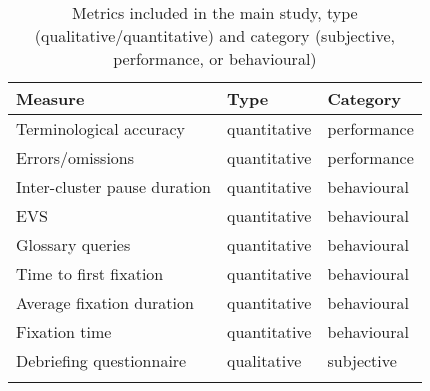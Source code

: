 \begin{table}
 \begin{tabular}{lll}
 \lsptoprule
 {Measure} & {Type} & {Category} \\\midrule
 Terminological accuracy & quantitative & performance \\
 Errors/omissions & quantitative & performance \\
 Inter-cluster pause duration & quantitative & behavioural \\
 EVS & quantitative & behavioural \\
 Glossary queries & quantitative & behavioural \\
 Time to first fixation & quantitative & behavioural \\
 Average fixation duration & quantitative & behavioural \\
 Fixation time & quantitative & behavioural \\
 Debriefing questionnaire & qualitative & subjective \\
 \lspbottomrule
 \end{tabular}
\caption[Metrics included in the main study]{Metrics included in the main study, type (qualitative\slash quantitative) and category (subjective, performance, or behavioural)}
\label{tab:metrics_overview}
\end{table}

